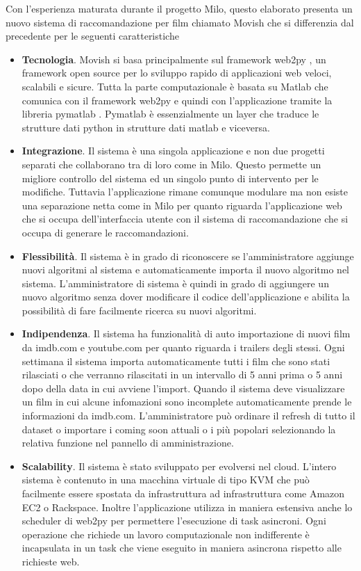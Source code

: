 Con l'esperienza maturata durante il progetto Milo, questo elaborato presenta un nuovo sistema di raccomandazione per film chiamato Movish che si differenzia dal precedente per le seguenti caratteristiche
\begin{itemize}
\item \textbf{Tecnologia}. Movish si basa principalmente sul framework web2py \cite{web2py}, un framework open source per lo sviluppo rapido di applicazioni web veloci, scalabili e sicure. Tutta la parte computazionale è basata su Matlab \cite{matlab} che comunica con il framework web2py e quindi con l'applicazione tramite la libreria pymatlab \cite{pymatlab}. Pymatlab \`e essenzialmente un layer che traduce le strutture dati python in strutture dati matlab e viceversa.
\item \textbf{Integrazione}. Il sistema \`e una singola applicazione e non due progetti separati che collaborano tra di loro come in Milo. Questo permette un migliore controllo del sistema ed un singolo punto di intervento per le modifiche. Tuttavia l'applicazione rimane comunque modulare ma non esiste una separazione netta come in Milo per quanto riguarda l'applicazione web che si occupa dell'interfaccia utente con il sistema di raccomandazione che si occupa di generare le raccomandazioni.
\item \textbf{Flessibilit\`a}. Il sistema \`e in grado di riconoscere se l'amministratore aggiunge nuovi algoritmi al sistema e automaticamente importa il nuovo algoritmo nel sistema. L'amministratore di sistema \`e quindi in grado di aggiungere un nuovo algoritmo senza dover modificare il codice dell'applicazione e abilita la possibilit\`a di fare facilmente ricerca su nuovi algoritmi. 
\item \textbf{Indipendenza}. Il sistema ha funzionalit\`a di auto importazione di nuovi film da imdb.com e youtube.com per quanto riguarda i trailers degli stessi. Ogni settimana il sistema importa automaticamente tutti i film che sono stati rilasciati o che verranno rilascitati in un intervallo di 5 anni prima o 5 anni dopo della data in cui avviene l'import. Quando il sistema deve visualizzare un film in cui alcune infomazioni sono incomplete automaticamente prende le informazioni da imdb.com. L'amministratore pu\`o ordinare il refresh di tutto il dataset o importare i coming soon attuali o i pi\`u popolari selezionando la relativa funzione nel pannello di amministrazione.
\item \textbf{Scalability}. Il sistema \`e stato sviluppato per evolversi nel cloud. L'intero sistema \`e contenuto in una macchina virtuale di tipo KVM che pu\`o facilmente essere spostata da infrastruttura ad infrastruttura come Amazon EC2 o Rackspace. Inoltre l'applicazione utilizza in maniera estensiva anche lo scheduler di web2py per permettere l'esecuzione di task asincroni. Ogni operazione che richiede un lavoro computazionale non indifferente \`e incapsulata in un task che viene eseguito in maniera asincrona rispetto alle richieste web.
\end{itemize}

